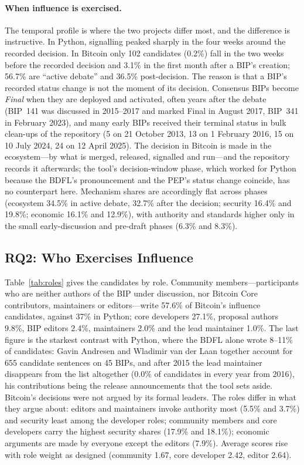 \paragraph{When influence is exercised.} The temporal profile is where the two projects differ most, and the difference is instructive. In Python, signalling peaked sharply in the four weeks around the recorded decision. In Bitcoin only 102 candidates (0.2\%) fall in the two weeks before the recorded decision and 3.1\% in the first month after a BIP's creation; 56.7\% are ``active debate'' and 36.5\% post-decision. The reason is that a BIP's recorded status change is not the moment of its decision. Consensus BIPs become \emph{Final} when they are deployed and activated, often years after the debate (BIP~141 was discussed in 2015--2017 and marked Final in August 2017, BIP~341 in February 2023), and many early BIPs received their terminal status in bulk clean-ups of the repository (5 on 21 October 2013, 13 on 1 February 2016, 15 on 10 July 2024, 24 on 12 April 2025). The decision in Bitcoin is made in the ecosystem---by what is merged, released, signalled and run---and the repository records it afterwards; the tool's decision-window phase, which worked for Python because the BDFL's pronouncement and the PEP's status change coincide, has no counterpart here. Mechanism shares are accordingly flat across phases (ecosystem 34.5\% in active debate, 32.7\% after the decision; security 16.4\% and 19.8\%; economic 16.1\% and 12.9\%), with authority and standards higher only in the small early-discussion and pre-draft phases (6.3\% and 8.3\%).

\subsection{RQ2: Who Exercises Influence}

Table~\ref{tab:roles} gives the candidates by role. Community members---participants who are neither authors of the BIP under discussion, nor Bitcoin Core contributors, maintainers or editors---write 57.6\% of Bitcoin's influence candidates, against 37\% in Python; core developers 27.1\%, proposal authors 9.8\%, BIP editors 2.4\%, maintainers 2.0\% and the lead maintainer 1.0\%. The last figure is the starkest contrast with Python, where the BDFL alone wrote 8--11\% of candidates: Gavin Andresen and Wladimir van der Laan together account for 655 candidate sentences on 45 BIPs, and after 2015 the lead maintainer disappears from the list altogether (0.0\% of candidates in every year from 2016), his contributions being the release announcements that the tool sets aside. Bitcoin's decisions were not argued by its formal leaders. The roles differ in what they argue about: editors and maintainers invoke authority most (5.5\% and 3.7\%) and security least among the developer roles; community members and core developers carry the highest security shares (17.9\% and 18.1\%); economic arguments are made by everyone except the editors (7.9\%). Average scores rise with role weight as designed (community 1.67, core developer 2.42, editor 2.64).

